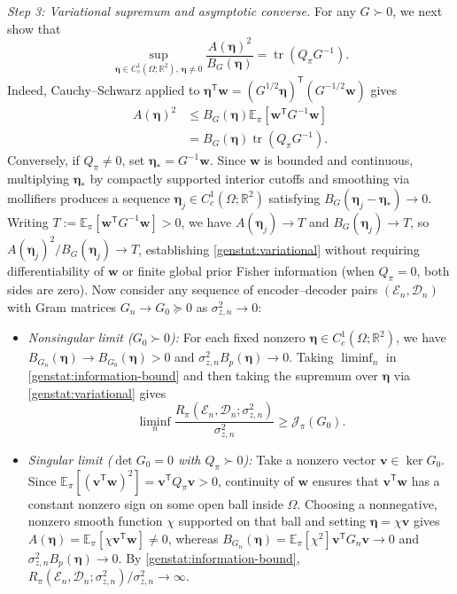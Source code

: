 \documentclass[journal,12pt,onecolumn,draftclsnofoot]{IEEEtran}
\newcommand{\enc}{\mathscr{E}}\newcommand{\dec}{\mathscr{D}}\newcommand{\R}{\mathbb R}\newcommand{\C}{\mathbb C}
\newcommand{\T}{\mathsf T}\newcommand{\suc}{\succeq}
\begin{document}
\emph{Step 3: Variational supremum and asymptotic converse.}
For any $G\succ0$, we next show that
\begin{equation}
 \sup_{\boldsymbol\eta\in C_c^1(\Omega;\R^2),\,\boldsymbol\eta\ne0}
 \frac{A(\boldsymbol\eta)^2}{B_G(\boldsymbol\eta)}
 =\operatorname{tr}(Q_\pi G^{-1}).
 \label{genstat:variational}
\end{equation}
Indeed, Cauchy--Schwarz applied to $\boldsymbol\eta^\T\boldsymbol w=(G^{1/2}\boldsymbol\eta)^\T(G^{-1/2}\boldsymbol w)$ gives
\begin{align*}
 A(\boldsymbol\eta)^2
 &\le B_G(\boldsymbol\eta)\mathbb E_\pi[\boldsymbol w^\T G^{-1}\boldsymbol w]\\
 &=B_G(\boldsymbol\eta)\operatorname{tr}(Q_\pi G^{-1}).
\end{align*}
Conversely, if $Q_\pi\ne0$, set $\boldsymbol\eta_*=G^{-1}\boldsymbol w$.
Since $\boldsymbol w$ is bounded and continuous, multiplying $\boldsymbol\eta_*$ by compactly supported interior cutoffs and smoothing via mollifiers produces a sequence $\boldsymbol\eta_j\in C_c^1(\Omega;\R^2)$ satisfying $B_G(\boldsymbol\eta_j-\boldsymbol\eta_*)\to0$.
Writing $T:=\mathbb E_\pi[\boldsymbol w^\T G^{-1}\boldsymbol w]>0$, we have $A(\boldsymbol\eta_j)\to T$ and $B_G(\boldsymbol\eta_j)\to T$, so $A(\boldsymbol\eta_j)^2/B_G(\boldsymbol\eta_j)\to T$, establishing \eqref{genstat:variational} without requiring differentiability of $\boldsymbol w$ or finite global prior Fisher information (when $Q_\pi=0$, both sides are zero). Now consider any sequence of encoder--decoder pairs $(\enc_n,\dec_n)$ with Gram matrices $G_n\to G_0\succeq0$ as $\sigma_{z,n}^2\to0$:
\begin{itemize}
\item \emph{Nonsingular limit ($G_0\succ0$):} For each fixed nonzero $\boldsymbol\eta\in C_c^1(\Omega;\R^2)$, we have $B_{G_n}(\boldsymbol\eta)\to B_{G_0}(\boldsymbol\eta)>0$ and $\sigma_{z,n}^2B_p(\boldsymbol\eta)\to0$. Taking $\liminf_n$ in \eqref{genstat:information-bound} and then taking the supremum over $\boldsymbol\eta$ via \eqref{genstat:variational} gives
\begin{equation}
 \liminf_n\frac{R_\pi(\enc_n,\dec_n;\sigma_{z,n}^2)}{\sigma_{z,n}^2}
 \ge\mathcal J_\pi(G_0).
 \label{genstat:changing-limit}
\end{equation}
\item \emph{Singular limit ($\det G_0=0$ with $Q_\pi\succ0$):} Take a nonzero vector $\boldsymbol v\in\ker G_0$. Since $\mathbb E_\pi[(\boldsymbol v^\T\boldsymbol w)^2]=\boldsymbol v^\T Q_\pi\boldsymbol v>0$, continuity of $\boldsymbol w$ ensures that $\boldsymbol v^\T\boldsymbol w$ has a constant nonzero sign on some open ball inside $\Omega$. Choosing a nonnegative, nonzero smooth function $\chi$ supported on that ball and setting $\boldsymbol\eta=\chi\boldsymbol v$ gives $A(\boldsymbol\eta)=\mathbb E_\pi[\chi\boldsymbol v^\T\boldsymbol w]\ne0$, whereas $B_{G_n}(\boldsymbol\eta)=\mathbb E_\pi[\chi^2]\boldsymbol v^\T G_n\boldsymbol v\to0$ and $\sigma_{z,n}^2B_p(\boldsymbol\eta)\to0$. By \eqref{genstat:information-bound}, $R_\pi(\enc_n,\dec_n;\sigma_{z,n}^2)/\sigma_{z,n}^2\to\infty$.
\end{itemize}
\end{document}
